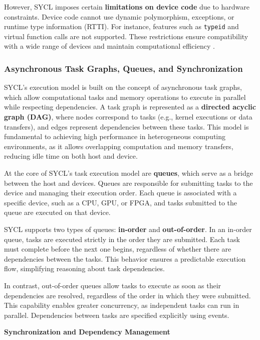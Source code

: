 However, SYCL imposes certain \textbf{limitations on device code} due to hardware constraints. Device code cannot use dynamic
polymorphism, exceptions, or runtime type information (RTTI). For instance, features such as \texttt{typeid} and virtual function
calls are not supported. These restrictions ensure compatibility with a wide range of devices and maintain computational efficiency
\cite{reinders2020data}.

\subsubsection{Asynchronous Task Graphs, Queues, and Synchronization}

SYCL’s execution model is built on the concept of asynchronous task graphs, which allow computational tasks and memory operations to
execute in parallel while respecting dependencies. A task graph is represented as a \textbf{directed acyclic graph (DAG)}, where
nodes correspond to tasks (e.g., kernel executions or data transfers), and edges represent dependencies between these tasks. This
model is fundamental to achieving high performance in heterogeneous computing environments, as it allows overlapping computation and
memory transfers, reducing idle time on both host and device.

At the core of SYCL’s task execution model are \textbf{queues}, which serve as a bridge between the host and devices. Queues are
responsible for submitting tasks to the device and managing their execution order. Each queue is associated with a specific device,
such as a CPU, GPU, or FPGA, and tasks submitted to the queue are executed on that device.

SYCL supports two types of queues: \textbf{in-order} and \textbf{out-of-order}. In an in-order queue, tasks are executed strictly in
the order they are submitted. Each task must complete before the next one begins, regardless of whether there are dependencies between
the tasks. This behavior ensures a predictable execution flow, simplifying reasoning about task dependencies.

In contrast, out-of-order queues allow tasks to execute as soon as their dependencies are resolved, regardless of the order in which
they were submitted. This capability enables greater concurrency, as independent tasks can run in parallel. Dependencies between
tasks are specified explicitly using events. \cite{SYCL2020}

\textbf{Synchronization and Dependency Management}

